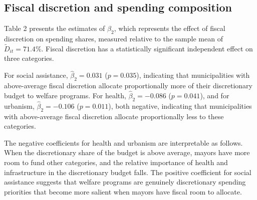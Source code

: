 \documentclass[12pt, a4paper]{article}
\begin{document}
\subsection*{Fiscal discretion and spending composition}

\begin{table}[htbp]
\centering
\caption{Effect of Fiscal Discretion on Discretionary Spending Shares ($\hat{\beta}_2$)}
\label{tab:beta2}
\end{table}

Table 2 presents the estimates of $\beta_2$, which represents the effect of fiscal discretion on spending shares, measured relative to the sample mean of $\tilde{D}_{it} = 71.4\%$. Fiscal discretion has a statistically significant independent effect on three categories.

For social assistance, $\hat{\beta}_2 = 0.031$ ($p = 0.035$), indicating that municipalities with above-average fiscal discretion allocate proportionally more of their discretionary budget to welfare programs. For health, $\hat{\beta}_2 = -0.086$ ($p = 0.041$), and for urbanism, $\hat{\beta}_2 = -0.106$ ($p = 0.011$), both negative, indicating that municipalities with above-average fiscal discretion allocate proportionally less to these categories.

The negative coefficients for health and urbanism are interpretable as follows. When the discretionary share of the budget is above average, mayors have more room to fund other categories, and the relative importance of health and infrastructure in the discretionary budget falls. The positive coefficient for social assistance suggests that welfare programs are genuinely discretionary spending priorities that become more salient when mayors have fiscal room to allocate.
\end{document}
